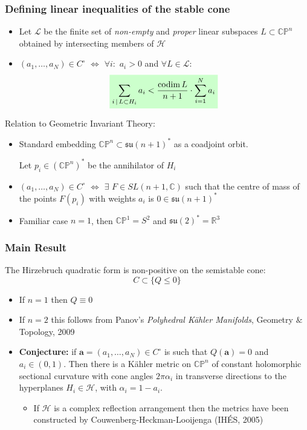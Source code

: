 \documentclass{beamer}
\newcommand{\C}{\mathbb{C}}
\newcommand{\R}{\mathbb{R}}
\newcommand{\CP}{\mathbb{CP}}
\newcommand{\mH}{\mathcal{H}}
\newcommand{\mL}{\mathcal{L}}
\newcommand{\ba}{\mathbf{a}}
\DeclareMathOperator{\codim}{codim}
\newcommand{\mathcolorbox}[2]{\colorbox{#1}{$\displaystyle #2$}}
\begin{document}
\begin{frame}
	\frametitle{Defining linear inequalities of the stable cone}
	\begin{itemize}
		\item Let \(\mL\) be the finite set of \emph{non-empty} and \emph{proper} linear subspaces \(L \subset \CP^n\) obtained by intersecting members of \(\mH\)
		
		\item \((a_1, \ldots, a_N) \in C^{\circ}\) \(\iff\) \(\forall i:\) \(a_i > 0\)  and \(\forall L \in \mL:\)
		\[
		\mathcolorbox{green!20}{
			\sum_{i \,|\, L \subset H_i} a_i < \frac{\codim L}{n+1} \cdot \sum_{i=1}^{N} a_i 
		}
		\]
	\end{itemize}

Relation to Geometric Invariant Theory:

\begin{itemize}
	\item Standard embedding \(\CP^n \subset \mathfrak{su}(n+1)^*\) as a coadjoint orbit. 
	
	Let \(p_i \in (\CP^n)^*\) be the annihilator of \(H_i\)
	
	\item \((a_1, \ldots, a_N) \in C^{\circ}\) \(\iff\) \(\exists\) \(F \in SL(n+1, \C)\) such that the centre of mass of the points \(F(p_i)\) with weights \(a_i\) is \(0 \in \mathfrak{su}(n+1)^*\)
	
	\item Familiar case \(n=1\), then \(\CP^1 = S^2\) and \(\mathfrak{su}(2)^* = \R^3\)
\end{itemize}
\end{frame}


\begin{frame}
	\frametitle{Main Result}
	\begin{theorem}
		The Hirzebruch quadratic form is non-positive on the semistable cone:
		\[
		C \subset \{Q \leq 0\}
		\]
	\end{theorem}

\begin{itemize}
	\item If \(n=1\) then \(Q \equiv 0\)
	\item If \(n=2\) this follows from Panov's \emph{Polyhedral K\"ahler Manifolds}, Geometry \(\&\) Topology, 2009
	\item \textbf{Conjecture:} if \(\ba = (a_1, \ldots, a_N) \in C^{\circ}\) is such that \(Q(\ba) = 0\) and  \(a_i \in (0,1)\). Then there is a K\"ahler metric on \(\CP^n\) of constant holomorphic sectional curvature with cone angles \(2\pi\alpha_i\) in transverse directions to the hyperplanes \(H_i \in \mH\), with \(\alpha_i = 1-a_i\).
	\begin{itemize}
		\item If \(\mH\) is a complex reflection arrangement then the metrics have been constructed by Couwenberg-Heckman-Looijenga (IH\'ES, 2005)
	\end{itemize}
\end{itemize}
\end{frame}
\end{document}
